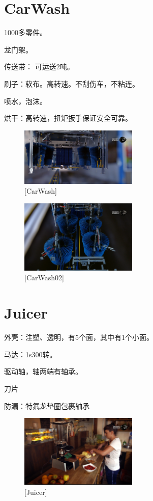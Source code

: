 \documentclass[UTF8]{../../../../RepresentationUniverse}
\begin{document}
\section{CarWash}

1000多零件。

龙门架。

传送带： 可运送2吨。

刷子：软布。高转速。不刮伤车，不粘连。

喷水，泡沫。

烘干：高转速，扭矩扳手保证安全可靠。

\begin{figure}[h]
    \centering
    \includegraphics[width=0.5\textwidth]{./src/figures/CarWash_2023-04-22_12-04-43.png}
    \caption{[CarWash]}
    \label{figure:CarWash}
\end{figure}

\begin{figure}[h]
    \centering
    \includegraphics[width=0.5\textwidth]{./src/figures/CarWash02_20230422_120921.png}
    \caption{[CarWash02]}
    \label{figure:CarWash02}
\end{figure}


\section{Juicer}

外壳：注塑、透明，有5个面，其中有1个小面。

马达：1s300转。

驱动轴，轴两端有轴承。

刀片

防漏：特氟龙垫圈包裹轴承

\begin{figure}[h]
    \centering
    \includegraphics[width=0.5\textwidth]{./src/figures/Juicer_20230422_121257.png}
    \caption{[Juicer]}
    \label{figure:Juicer}
\end{figure}
\end{document}
